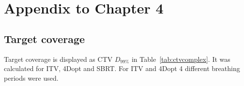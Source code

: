 % 
% 
% 
 
\chapter{Appendix to Chapter 4}

\section{Target coverage}

Target coverage is displayed as CTV $D_{99\%}$ in Table~\ref{tab:ctvcomplex}. It was calculated for ITV, 4Dopt and SBRT. For ITV and 4Dopt 4 different breathing periods were used.

